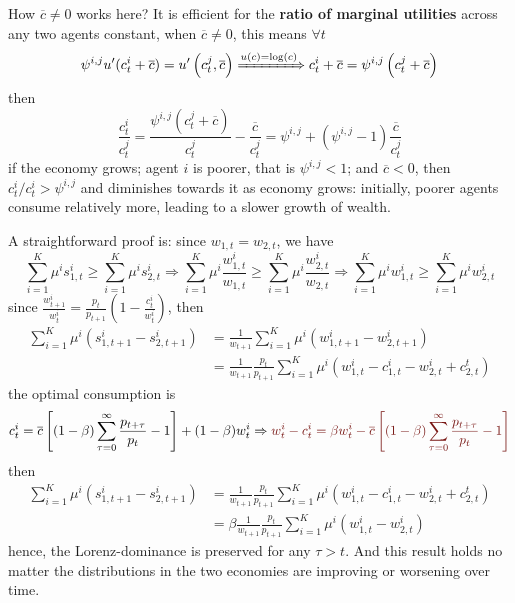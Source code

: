 \documentclass[10pt,landscape,a4paper]{article}
\let\bar\overline
\begin{document}
\begin{multicols*}{3}
How $\bar{c}\neq 0$ works here? It is efficient for the \textbf{ratio of marginal utilities} across any two agents constant, when $\bar{c}\neq 0$, this means $\forall t$
$$
\psi^{i,j} u'(c_t^i+\bar{c}) = u'\left(c_t^j,\bar{c}\right) \xRightarrow{u(c)=\log(c)} c_t^i+\bar{c} = \psi^{i,j}\left(c_t^j+\bar{c}\right)
$$
then 
$$
\frac{c_t^i}{c_t^j} = \frac{\psi^{i,j}\left(c_t^j+\bar{c}\right)}{c_t^j}-\frac{\bar{c}}{c_t^j} = \psi^{i,j} + (\psi^{i,j}-1)\frac{\bar{c}}{c_t^j}
$$
if the economy grows; agent $i$ is poorer, that is $\psi^{i,j}<1$; and $\bar{c}<0$, then $c_t^i/c_t^i>\psi^{i,j}$ and diminishes towards it as economy grows: initially, poorer agents consume relatively more, leading to a slower growth of wealth.

\vspace{2pt}

A straightforward proof is: since $w_{1,t}=w_{2,t}$, we have 
$$
\sum^K_{i=1}\mu^is_{1,t}^i \geq \sum^K_{i=1}\mu^is_{2,t}^i \Rightarrow \sum^K_{i=1}\mu^i\frac{w_{1,t}^i}{w_{1,t}} \geq \sum^K_{i=1}\mu^i\frac{w_{2,t}^i}{w_{2,t}} \Rightarrow \sum^K_{i=1}\mu^iw_{1,t}^i \geq \sum^K_{i=1}\mu^iw_{2,t}^i
$$
since $\frac{w^i_{t+1}}{w^i_t} =\frac{p_t}{p_{t+1}}(1-\frac{c^i_t}{w^i_t})$, then
\begin{align*}
    \sum^K_{i=1}\mu^i(s_{1,t+1}^i-s_{2,t+1}^i) &= \frac{1}{w_{t+1}}\sum^K_{i=1}\mu^i(w_{1,t+1}^i-w_{2,t+1}^i)\\ 
    &=\frac{1}{w_{t+1}}\frac{p_t}{p_{t+1}}\sum^{K}_{i=1}\mu^i\left( w_{1,t}^i -c_{1,t}^i -w_{2,t}^i+c_{2,t}^t \right)
\end{align*}
the optimal consumption is
$$
c_{t}^i = \bar{c}\left[ (1-\beta)\sum^{\infty}_{\tau=0}\frac{p_{t+\tau}}{p_t}-1 \right]+(1-\beta)w_t^i \Rightarrow {\color{myred}w_t^i-c_t^i = \beta w_t^i - \bar{c}\left[ (1-\beta)\sum^{\infty}_{\tau=0}\frac{p_{t+\tau}}{p_t}-1 \right]}
$$
then
\begin{align*}
    \sum^K_{i=1}\mu^i(s_{1,t+1}^i-s_{2,t+1}^i) &=\frac{1}{w_{t+1}}\frac{p_t}{p_{t+1}}\sum^{K}_{i=1}\mu^i\left( w_{1,t}^i -c_{1,t}^i -w_{2,t}^i+c_{2,t}^t \right)\\
    &= \beta \frac{1}{w_{t+1}}\frac{p_t}{p_{t+1}}\sum^{K}_{i=1}\mu^i\left( w_{1,t}^i-w_{2,t}^i \right)
\end{align*}
hence, the Lorenz-dominance is preserved for any $\tau>t$. And this result holds no matter the distributions in the two economies are improving or worsening over time.


\end{multicols*}
\end{document}
